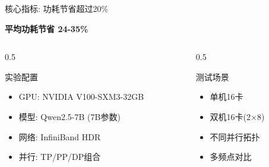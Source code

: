 \documentclass[aspectratio=169,10pt]{beamer}
\begin{document}
\begin{frame}{核心指标: 功耗节省超过20\%}
\begin{center}
\huge \textbf{平均功耗节省 \textcolor{successgreen}{24-35\%}}
\end{center}
\vspace{0.5cm}
\begin{columns}
\begin{column}{0.5\textwidth}
\begin{block}{实验配置}
\begin{itemize}
    \item GPU: NVIDIA V100-SXM3-32GB
    \item 模型: Qwen2.5-7B (7B参数)
    \item 网络: InfiniBand HDR
    \item 并行: TP/PP/DP组合
\end{itemize}
\end{block}
\end{column}
\begin{column}{0.5\textwidth}
\begin{block}{测试场景}
\begin{itemize}
    \item 单机16卡
    \item 双机16卡(2×8)
    \item 不同并行拓扑
    \item 多频点对比
\end{itemize}
\end{block}
\end{column}
\end{columns}
\end{frame}
\end{document}
